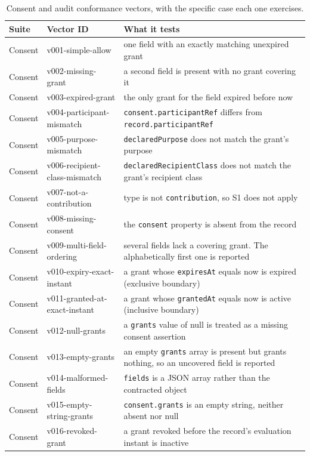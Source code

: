 \begin{table}[H]
\caption{Consent and audit conformance vectors, with the specific case each one exercises.\label{tab:t1}}
\begin{tabularx}{\textwidth}{llX}
\toprule
Suite & Vector ID & What it tests \\
\midrule
Consent & v001-simple-allow & one field with an exactly matching unexpired grant \\
Consent & v002-missing-grant & a second field is present with no grant covering it \\
Consent & v003-expired-grant & the only grant for the field expired before now \\
Consent & v004-participant-mismatch & \texttt{consent.participantRef} differs from \texttt{record.participantRef} \\
Consent & v005-purpose-mismatch & \texttt{declaredPurpose} does not match the grant's purpose \\
Consent & v006-recipient-class-mismatch & \texttt{declaredRecipientClass} does not match the grant's recipient class \\
Consent & v007-not-a-contribution & type is not \texttt{contribution}, so S1 does not apply \\
Consent & v008-missing-consent & the \texttt{consent} property is absent from the record \\
Consent & v009-multi-field-ordering & several fields lack a covering grant. The alphabetically first one is reported \\
Consent & v010-expiry-exact-instant & a grant whose \texttt{expiresAt} equals now is expired (exclusive boundary) \\
Consent & v011-granted-at-exact-instant & a grant whose \texttt{grantedAt} equals now is active (inclusive boundary) \\
Consent & v012-null-grants & a \texttt{grants} value of null is treated as a missing consent assertion \\
Consent & v013-empty-grants & an empty \texttt{grants} array is present but grants nothing, so an uncovered field is reported \\
Consent & v014-malformed-fields & \texttt{fields} is a JSON array rather than the contracted object \\
Consent & v015-empty-string-grants & \texttt{consent.grants} is an empty string, neither absent nor null \\
Consent & v016-revoked-grant & a grant revoked before the record's evaluation instant is inactive \\

\end{tabularx}
\end{table}
